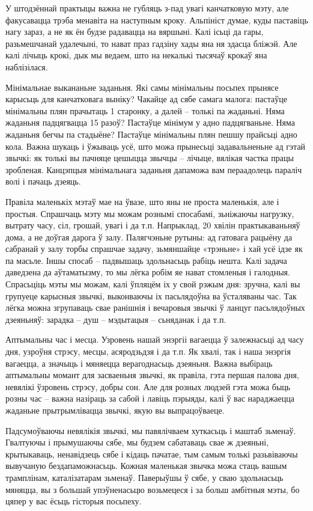 У штодзённай практыцы важна не губляць з-пад увагі канчатковую мэту, але факусавацца трэба менавіта на наступным кроку. Альпініст думае, куды паставіць нагу зараз, а не як ён будзе радавацца на вяршыні. Калі ісьці да гары, разьмешчанай удалечыні, то нават праз гадзіну хады яна ня здасца бліжэй. Але калі лічыць крокі, дык мы ведаем, што на некалькі тысячаў крокаў яна наблізілася.

Мінімальнае выкананьне заданьня. Які самы мінімальны посьпех прынясе карысьць для канчатковага выніку? Чакайце ад сябе самага малога: пастаўце мінімальны плян прачытаць 1 старонку, а далей – толькі па жаданьні. Няма жаданьня падцягвацца 15 разоў? Пастаўце мінімум у адно падцягваньне. Няма жаданьня бегчы па стадыёне? Пастаўце мінімальны плян пешшу прайсьці адно кола. Важна шукаць і ўжываць усё, што можа прынесьці задавальненьне ад гэтай звычкі: як толькі вы пачняце цешыцца звычцы – лічыце, вялікая частка працы зробленая. Канцэпцыя мінімальнага заданьня дапаможа вам пераадолець параліч волі і пачаць дзеяць.

Правіла маленькіх мэтаў мае на ўвазе, што яны не проста маленькія, але і простыя. Спрашчаць мэту мы можам рознымі спосабамі, зьніжаючы нагрузку, вытрату часу, сіл, грошай, увагі і да т.п. Напрыклад, 20 хвілін практыкаваньняў дома, а не доўгая дарога ў залу. Палягчэньне рутыны: ад гатовага рацыёну да сабранай у залу торбы спрашчае задачу, зьмяншайце «трэньне» і хай усё ідзе як па масьле. Іншы спосаб – падвышаць здольнасьць рабіць нешта. Калі задача даведзена да аўтаматызму, то мы лёгка робім яе нават стомленыя і галодныя. Спрасьціць мэты мы можам, калі ўпляцём іх у свой рэжым дня: зручна, калі вы групуеце карысныя звычкі, выконваючы іх пасьлядоўна ва ўсталяваны час. Так лёгка можна згрупаваць свае ранішнія і вечаровыя звычкі ў ланцуг пасьлядоўных дзеяньняў: зарадка – душ – мэдытацыя – сьняданак і да т.п.

Аптымальны час і месца. Узровень нашай энэргіі вагаецца ў залежнасьці ад часу дня, узроўня стрэсу, месцы, асяродзьдзя і да т.п. Як хвалі, так і наша энэргія вагаецца, а значыць і мяняецца верагоднасьць дзеяньня. Важна выбіраць аптымальны момант для засваеньня звычкі, як правіла, гэта першая палова дня, невялікі ўзровень стрэсу, добры сон. Але для розных людзей гэта можа быць розны час – важна назіраць за сабой і лавіць пэрыяды, калі ў вас нараджаецца жаданьне прытрымлівацца звычкі, якую вы выпрацоўваеце.

Падсумоўваючы невялікія звычкі, мы павялічваем хуткасьць і маштаб зьменаў. Гвалтуючы і прымушаючы сябе, мы будзем сабатаваць свае ж дзеяньні, крытыкаваць, ненавідзець сябе і кідаць пачатае, тым самым толькі разьвіваючы вывучаную бездапаможнасьць. Кожная маленькая звычка можа стаць вашым трамплінам, каталізатарам зьменаў. Паверыўшы ў сябе, у сваю здольнасьць мяняцца, вы з большай упэўненасьцю возьмецеся і за больш амбітныя мэты, бо цяпер у вас ёсьць гісторыя посьпеху.

